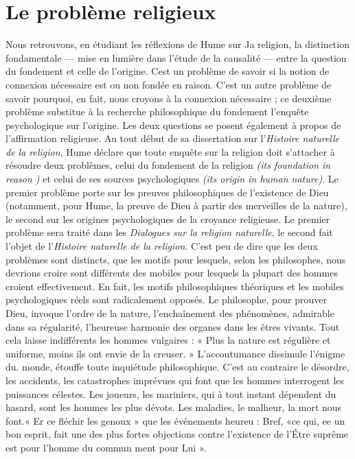 
\section{Le problème religieux}

Nous retrouvons, en étudiant les réflexions de Hume
sur Ja religion, la distinction fondamentale — mise en
lumière dans l’étude de la causalité — entre la question
du fondement et celle de l’origine. Cest un problème de
savoir si la notion de connexion nécessaire est ou non
fondée en raison. C’est un autre problème de savoir pourquoi,
en fait, nous croyons à la connexion nécessaire ;
ce deuxième problème substitue à la recherche philosophique
du fondement l’enquête psychologique sur l’origine.
Les deux questions se posent également à propos de l’affirmation
religieuse. Au tout début de sa dissertation sur
l’{\it Histoire naturelle de la religion}, Hume déclare que toute
enquête sur la religion doit s'attacher à résoudre deux
problèmes, celui du fondement de la religion {\it (its foundation in reason )}
et celui de ses sources psychologiques {\it (its origin in human nature)}.
Le premier problème porte sur
les preuves philosophiques de l’existence de Dieu (notamment,
pour Hume, la preuve de Dieu à partir des merveilles de la nature),
le second sur les origines psychologiques de la croyance religieuse.
Le premier problème sera
traité dans les {\it Dialogues sur la religion naturelle}, le second
fait l'objet de l’{\it Histoire naturelle de la religion}. C’est peu
de dire que les deux problèmes sont distincts, que les
motifs pour lesquels, selon les philosophes, nous devrions
croire sont différents des mobiles pour lesquels la plupart
des hommes croient effectivement. En fait, les motifs
philosophiques théoriques et les mobiles psychologiques
réels sont radicalement opposés. Le philosophe, pour
prouver Dieu, invoque l’ordre de la nature, l’enchaînement
des phénomènes, admirable dans sa régularité, l’heureuse
harmonie des organes dans les êtres vivants. Tout cela
laisse indifférents les hommes vulgaires : « Plus la nature
est régulière et uniforme, moins ils ont envie de la creuser. »
L’accoutumance dissimule l'énigme du. monde, étouffe
toute inquiétude philosophique. C'est au contraire le
désordre, les accidents, les catastrophes imprévues qui
font que les hommes interrogent les puissances célestes.
Les joueurs, les mariniers, qui à tout instant dépendent du
hasard, sont les hommes les plus dévots. Les maladies,
le malheur, la mort nous font.« Er ce fléchir les
genoux » que les événements heureu : Bref, «ce qui, ee
un bon esprit, fait une des plus fortes objections contre
l'existence de l’Étre suprême est pour l’homme du commun
ment pour Lui ». 

